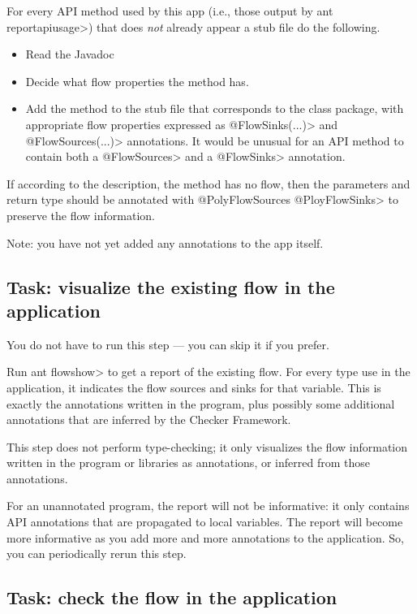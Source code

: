 For every API method used by this app (i.e., those output by \<ant
reportapiusage>) that does \emph{not} already appear a stub file do the following.
\begin{itemize}
\item
Read the Javadoc
\item
Decide what flow properties the method has.
\item
Add the method to the stub file that corresponds to the class package, with
appropriate flow properties expressed as \<@FlowSinks(...)> and
\<@FlowSources(...)> annotations.
It would be unusual for an API method to contain both a \<@FlowSources>
and a \<@FlowSinks> annotation.
\end{itemize}

If according to the description, the method has no flow, then the parameters and return type
 should be annotated with \<@PolyFlowSources @PloyFlowSinks>
  to preserve the flow information.


Note: you have not yet added any annotations to the app itself.


\subsection{Task: visualize the existing flow in the application}

You do not have to run this step --- you can skip it if you
prefer.

Run \<ant flowshow> to get a report of the
existing flow.
For every type use in the application, it indicates the flow sources
and sinks for that variable. This is exactly the annotations written
in the program, plus possibly some additional annotations that are
inferred by the Checker Framework.


This step does not perform type-checking; it only visualizes the flow
information written in the program or libraries as annotations, or
inferred from those annotations.


For an unannotated program, the report will not be informative: it
only contains API annotations that are propagated to local
variables. The report will become more informative as you add more and
more annotations to the application. So, you can periodically rerun
this step. 


\subsection{Task: check the flow in the application}

